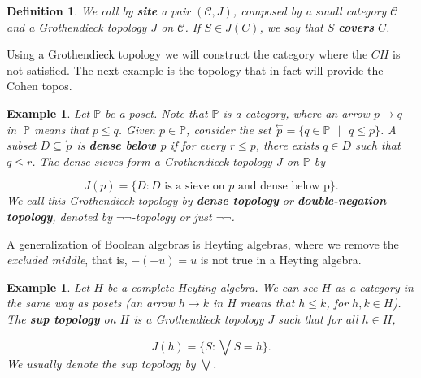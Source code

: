 \documentclass[10pt,a4paper]{amsart}
\newtheorem{Def}[Theo]{Definition}
\newtheorem{Example}[Theo]{Example}
\newcommand{\C}{\mathcal{C}}
\newcommand{\Po}{\mathbb{P}}
\begin{document}
\begin{Def}\label{Sitedef}
We call by \textbf{site} a pair $(\C,J)$, composed by a small category $\C$ and a Grothendieck topology $J$ on $\C$. If $S \in J(C)$, we say that $S$ \textbf{covers} $C$. 
\end{Def}

Using a Grothendieck topology we will construct the category where the $CH$ is not satisfied. The next example is the topology that in fact will provide the Cohen topos.

\begin{Example}
	Let $\Po$ be a poset. Note that $\Po$ is a category, where an arrow $p \to q$ in $~\Po$ means that $ p\leq q$. Given $p \in \Po$, consider the set $\overset{\leftarrow}{p} = \{q \in \Po\text{ } | \text{ }q \leq p\}$. A subset $D \subseteq \overset{\leftarrow}{p}$ is \textbf{dense below $p$} if for every $r \leq p$, there exists $q \in D$ such that $q \leq r$. The dense sieves form a Grothendieck topology $J$ on $\Po$ by
	
	$$J(p) = \{D : D \text{ is a sieve on } p \text{ and dense below p}\}. $$
	We call this Grothendieck topology by \textbf{dense topology} or \textbf{double-negation topology}, denoted by $\neg\neg$-topology or just $\neg\neg$.  
\end{Example}
 A generalization of Boolean algebras is Heyting algebras, where we remove the \emph{excluded middle}, that is, $-(-u) = u$ is not true in  a Heyting algebra.
\begin{Example}
	Let $H$ be a complete Heyting algebra. We can see $H$  as a category in the same way as posets (an arrow $h \to k$ in $H$ means that $h \leq k$, for $h,k \in H$). The \textbf{sup topology} on $H$ is a Grothendieck topology $J$ such that for all $h \in H$,
	
	$$J(h) = \{S: \bigvee  S = h\}.$$
We usually denote the sup topology by $\bigvee$.
\end{Example}
\end{document}
